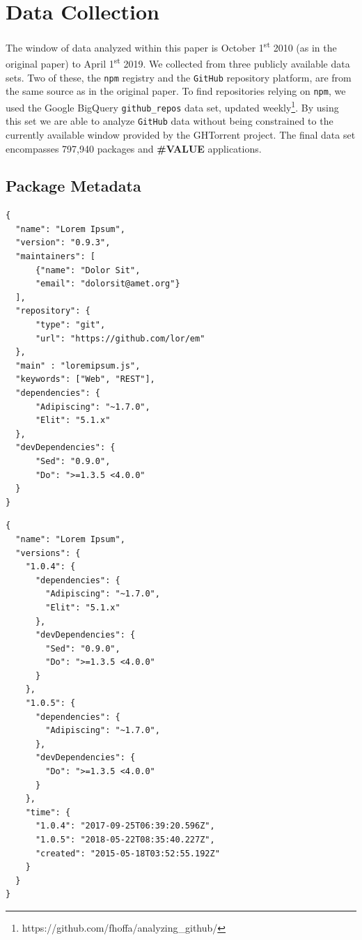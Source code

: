 \documentclass[10pt,conference]{IEEEtran}
\def\code#1{\texttt{#1}}
\begin{document}
\section{Data Collection}
The window of data analyzed within this paper is October 1\textsuperscript{st} 2010 (as in the original paper) to April 1\textsuperscript{st} 2019.
We collected from three publicly available data sets. Two of these, the \code{npm} registry and the \code{GitHub} repository platform, are from the same source as in the original paper.
To find repositories relying on \code{npm}, we used the Google BigQuery \code{github\_repos} data set, updated weekly\footnote{https://github.com/fhoffa/analyzing\_github/}.
By using this set we are able to analyze \code{GitHub} data without being constrained to the currently available window provided by the GHTorrent project\cite{Gousi13}.
The final data set encompasses 797,940 packages and \textbf{\#VALUE} applications.

\subsection{Package Metadata}

\begin{lstlisting}[caption={A mock \code{npm} package.json. Some fields omitted for brevity.},captionpos=b,
  label=samplePkg, frame=single, firstline=1]
{
  "name": "Lorem Ipsum",
  "version": "0.9.3",
  "maintainers": [
      {"name": "Dolor Sit",
      "email": "dolorsit@amet.org"}
  ],
  "repository": {
      "type": "git",
      "url": "https://github.com/lor/em"
  },
  "main" : "loremipsum.js",
  "keywords": ["Web", "REST"],
  "dependencies": {
      "Adipiscing": "~1.7.0",
      "Elit": "5.1.x"
  },
  "devDependencies": {
      "Sed": "0.9.0",
      "Do": ">=1.3.5 <4.0.0" 
  }
}
\end{lstlisting}

\begin{lstlisting}[caption={A mock simplified \code{npm} metadata file.},captionpos=b,
  label=sampleSimpleMetadata, frame=single, firstline=1]
{
  "name": "Lorem Ipsum",
  "versions": {
    "1.0.4": {
      "dependencies": {
        "Adipiscing": "~1.7.0",
        "Elit": "5.1.x"
      },
      "devDependencies": {
        "Sed": "0.9.0",
        "Do": ">=1.3.5 <4.0.0"
      }
    },
    "1.0.5": {
      "dependencies": {
        "Adipiscing": "~1.7.0",
      },
      "devDependencies": {
        "Do": ">=1.3.5 <4.0.0"
      }
    },
    "time": {
      "1.0.4": "2017-09-25T06:39:20.596Z",
      "1.0.5": "2018-05-22T08:35:40.227Z",
      "created": "2015-05-18T03:52:55.192Z"
    }
  }
}
\end{lstlisting}
\end{document}

